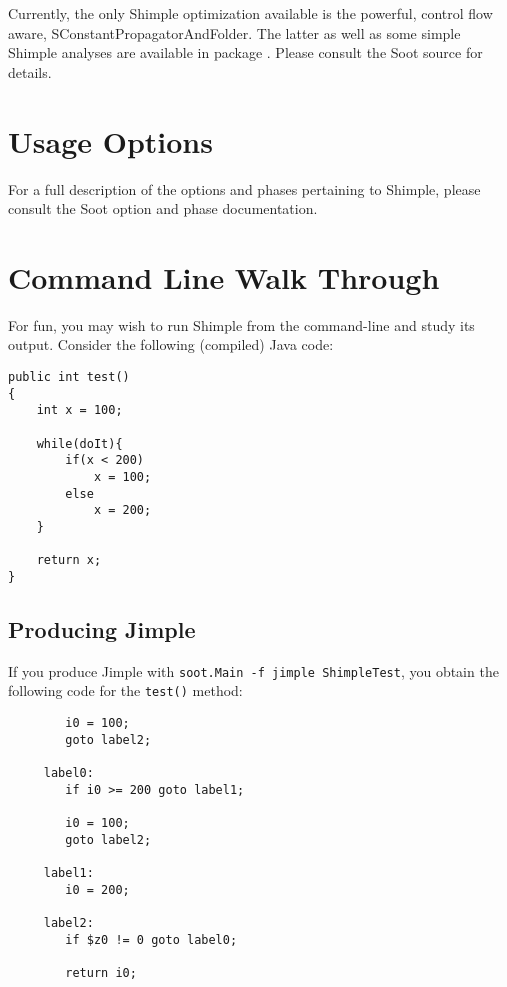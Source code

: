 \documentclass[10pt,letterpaper,oneside,onecolumn]{article}
\begin{document}
Currently, the only Shimple optimization available is the powerful,
control flow aware, SConstantPropagatorAndFolder.  The latter as well
as some simple Shimple analyses are available in package
.
Please consult the Soot source for details.

\section{Usage Options}

For a full description of the options and phases pertaining to
Shimple, please consult the
Soot option and phase documentation.

\section{Command Line Walk Through}

For fun, you may wish to run Shimple from the command-line and study
its output.  Consider the following (compiled) Java code:

\begin{verbatim}
public int test()
{
    int x = 100;
        
    while(doIt){
        if(x < 200)
            x = 100;
        else
            x = 200;
    }

    return x;
}
\end{verbatim}

\subsection{Producing Jimple}

If you produce Jimple with 
{\tt soot.Main -f jimple ShimpleTest}, you obtain the following code
for the {\tt test()} method:

\begin{verbatim}
        i0 = 100;
        goto label2;

     label0:
        if i0 >= 200 goto label1;

        i0 = 100;
        goto label2;

     label1:
        i0 = 200;

     label2:
        if $z0 != 0 goto label0;

        return i0;
\end{verbatim}
\end{document}

